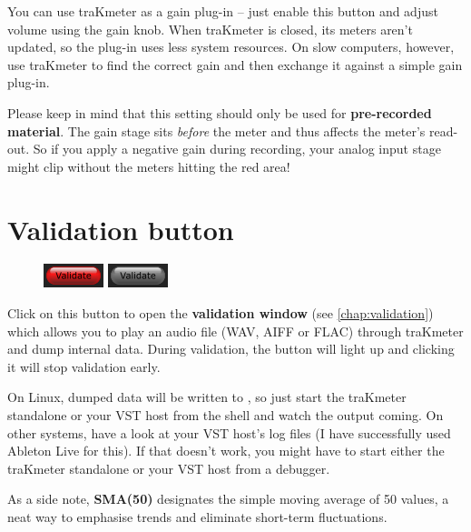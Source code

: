 You can use traKmeter as a gain plug-in -- just enable this button and
adjust volume using the gain knob.  When traKmeter is closed, its
meters aren't updated, so the plug-in uses less system resources.  On
slow computers, however, use traKmeter to find the correct gain and
then exchange it against a simple gain plug-in.

Please keep in mind that this setting should only be used for
\textbf{pre-recorded material}.  The gain stage sits \emph{before} the
meter and thus affects the meter's read-out.  So if you apply a
negative gain during recording, your analog input stage might clip
without the meters hitting the red area!

\section{Validation button}
\label{sec:validation_button}

\begin{figure}
  \includegraphics[scale=\screenshotscale,clip]{include/images/button_validate_on.png}
  \newline \vspace{-0.9\baselineskip}
  \includegraphics[scale=\screenshotscale,clip]{include/images/button_validate_off.png}
\end{figure}

Click on this button to open the \textbf{validation window} (see
\ref{chap:validation}) which allows you to play an audio file (WAV,
AIFF or FLAC) through traKmeter and dump internal data.  During
validation, the button will light up and clicking it will stop
validation early.

On Linux, dumped data will be written to , so just start
the traKmeter standalone or your VST host from the shell and watch the
output coming.  On other systems, have a look at your VST host's log
files (I have successfully used Ableton Live for this).  If that
doesn't work, you might have to start either the traKmeter standalone
or your VST host from a debugger.

As a side note, \textbf{SMA(50)} designates the simple moving average
of 50 values, a neat way to emphasise trends and eliminate short-term
fluctuations.

